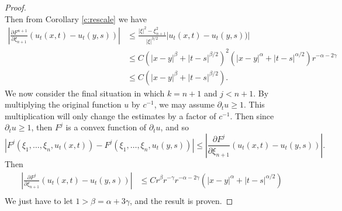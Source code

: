 \documentclass{amsart}
\numberwithin{equation}{section}
\begin{document}
\begin{proof}
\[    \]
    Then from Corollary \ref{c:rescale} we have 
    \[
    \begin{aligned}
    \left|\frac{\partial F^{n+1}}{\partial \xi_{n+1}} (u_{t}(x,t) -u_{t}(y,s))\right|
    &\leq  \frac{|\xi|^2 - \xi_{n+1}^2}{|\xi|^{3/2}} |u_{t}(x,t) -u_{t}(y,s))|\\
    &\leq C (|x-y|^{\beta} + |t - s|^{\beta/2})^2 (|x-y|^{\alpha} + |t - s|^{\alpha/2})r^{-\alpha- 2\gamma} \\
    &\leq C (|x-y|^{\beta} + |t - s|^{\beta/2}). 
    \end{aligned}
    \]
    We now consider the final situation in which $k=n+1$ and $j<n+1$. By multiplying the original function $u$ by $c^{-1}$, we may assume $\partial_t u \geq 1$. This multiplication will only change the estimates by a factor of $c^{-1}$. Then  since $\partial_t u \geq 1$, then $F^j$ is a convex function of $\partial_t u$, and so 
    \[
    |F^{j}(\xi_1,\ldots,\xi_n,u_t(x,t))- F^{j}(\xi_1,\ldots,\xi_n,u_t(y,s))|
    \leq \left|\frac{\partial F^{j}}{\partial \xi_{n+1}} (u_{t}(x,t) -u_{t}(y,s))\right|.
    \]
     Then 
    \[
    \begin{aligned}
     \left|\frac{\partial F^{j}}{\partial \xi_{n+1}} (u_{t}(x,t) -u_{t}(y,s)) \right|
     &\leq Cr^{\beta} r^{-\gamma} r^{-\alpha-2\gamma}(|x-y|^{\alpha}+ |t - s|^{\alpha/2}) \\
    \end{aligned}
    \]
    We just have to let $1>\beta=\alpha+3\gamma$, and the result is proven.  
    
     
\end{proof}


































    
\end{document}
